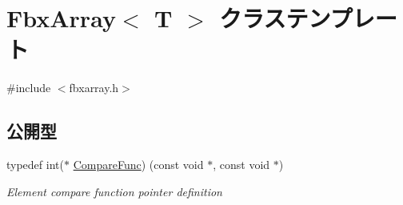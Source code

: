 \hypertarget{class_fbx_array}{}\section{Fbx\+Array$<$ T $>$ クラステンプレート}
\label{class_fbx_array}


{\ttfamily \#include $<$fbxarray.\+h$>$}

\subsection*{公開型}
\begin{DoxyCompactItemize}
\item 
typedef int($\ast$ \hyperlink{class_fbx_array_a3f251a5b7314e26facb298dcf3856557}{Compare\+Func}) (const void $\ast$, const void $\ast$)
\begin{DoxyCompactList}\small\item\em Element compare function pointer definition \end{DoxyCompactList}\end{DoxyCompactItemize}
